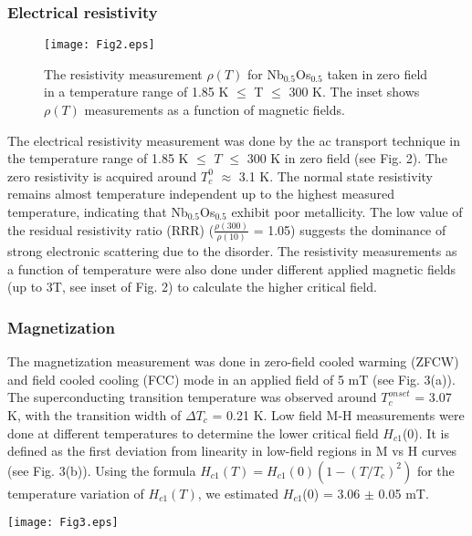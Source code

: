 \documentclass[reprint, superscriptaddress, secnumarabic, amssymb, nobibnotes, aps, prl]{revtex4-1}
\begin{document}
\subsubsection{Electrical resistivity}
\begin{figure}
\texttt{[image: Fig2.eps]}
\caption{\label{Fig2:Resistivity} The resistivity measurement $\rho(T)$ for Nb$_{0.5}$Os$_{0.5}$ taken in zero field in a temperature range of 1.85 K $\le$ T $\le$ 300 K. The inset shows $\rho(T)$ measurements as a function of magnetic fields.}
\end{figure}
The electrical resistivity measurement was done by the ac transport technique in the temperature range of 1.85 K $\le$ $\textit{T}$ $\le$ 300 K in zero field (see Fig. 2). The zero resistivity is acquired around $T_{c}^{0}$ $\approx$ 3.1 K. The normal state resistivity remains almost temperature independent up to the highest measured temperature, indicating that Nb$_{0.5}$Os$_{0.5}$ exhibit poor metallicity. The low value of the residual resistivity ratio (RRR) ($\frac{\rho(300)}{\rho(10)}$ = 1.05) suggests the dominance of strong electronic scattering due to the disorder. The resistivity measurements as a function of temperature were also done under different applied magnetic fields (up to 3T, see inset of Fig. 2) to calculate the higher critical field.
\subsubsection{Magnetization}
The magnetization measurement was done in zero-field cooled warming (ZFCW) and field cooled cooling (FCC) mode in an applied field of 5 mT (see Fig. 3(a)). The superconducting transition temperature was observed around $T_{c}^{onset}$ = 3.07 K, with the transition width of $\Delta T_{c}$ = 0.21 K. Low field M-H measurements were done at different temperatures to determine the lower critical field $H_{c1}$(0). It is defined as the first deviation from linearity in low-field regions in M vs H curves (see Fig. 3(b)). Using the formula $H_{c1}(T)= H_{c1}(0)(1-(T/T_{c})^{2})$ for the temperature variation of $H_{c1}(T)$, we estimated $H_{c1}$(0) = 3.06 $\pm$ 0.05 mT.
\begin{figure*}[t]
\texttt{[image: Fig3.eps]}
\caption{\label{Fig3:zfc} (a) The magnetization data for Nb$_{0.5}$Os$_{0.5}$ taken in 5 mT field shows the superconducting transition at $T_{c}$ = 3.07 K. (b) The lower critical field $H_{c1}$ estimated by the GL formula was 3.06 mT. Inset shows the M vs H curves taken at various temperatures. (c) The upper critical field $H_{c2}$(T) obtained from magnetization, ac susceptibility, resistivity, and specific heat measurements. The dotted lines show the GL fits, yielding $H_{c2}$(0) $\simeq$ 5.4 T for Nb$_{0.5}$Os$_{0.5}$.} 
\end{figure*}
\end{document}
